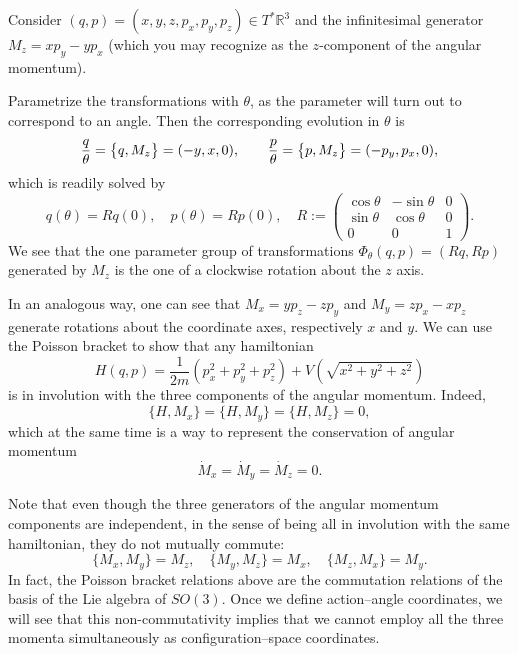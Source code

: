 \documentclass[english,fontsize=11pt,paper=a5,oneside]{scrbook}
\newcommand{\R}{\mathbb{R}}
\let\d\relax
\newcommand{\d}{\mathrm{d}}
\theoremstyle{definition}
\newenvironment{example}
  {\pushQED{\qed}\renewcommand{\qedsymbol}{$\lozenge$}\examplex}
  {\popQED\endexamplex}
\begin{document}
\begin{example}
  Consider $(q,p) = (x,y,z,p_x,p_y,p_z)\in T^* \R^3$ and the infinitesimal generator $M_z = x p_y - y p_x$ (which you may recognize as the $z$-component of the angular momentum).

  Parametrize the transformations with $\theta$, as the parameter will turn out to correspond to an angle. Then the corresponding evolution in $\theta$ is
  \begin{equation}
    \frac{\d q}{\d\theta} = \big\{q, M_z\big\} = (-y, x, 0),\qquad
    \frac{\d p}{\d\theta} = \big\{p, M_z\big\} = (-p_y, p_x, 0),
  \end{equation}
  which is readily solved by
  \begin{equation}
    q(\theta)= R q(0), \quad p(\theta) = R p(0), \quad
    R := \begin{pmatrix}
      \cos\theta & -\sin\theta & 0 \\
      \sin\theta & \cos\theta  & 0 \\
      0          & 0           & 1
    \end{pmatrix}.
  \end{equation}
  We see that the one parameter group of transformations $\Phi_\theta(q,p) = (Rq, Rp)$ generated by $M_z$ is the one of a clockwise rotation about the $z$ axis.

  In an analogous way, one can see that $M_x = yp_z-zp_y$ and $M_y = zp_x - xp_z$ generate rotations about the coordinate axes, respectively $x$ and $y$.
  We can use the Poisson bracket to show that any hamiltonian
  \begin{equation}
    H(q,p) = \frac1{2m}\left(p_x^2 + p_y^2 + p_z^2\right) + V\left(\sqrt{x^2 + y^2 + z^2}\right)
  \end{equation}
  is in involution with the three components of the angular momentum. Indeed,
  \begin{equation}
    \big\{H,M_x\big\} = \big\{H,M_y\big\} = \big\{H,M_z\big\} = 0,
  \end{equation}
  which at the same time is a way to represent the conservation of angular momentum
  \begin{equation}
    \dot M_x = \dot M_y = \dot M_z = 0.
  \end{equation}

  Note that even though the three generators of the angular momentum components are independent, in the sense of being all in involution with the same hamiltonian, they do not mutually commute:
  \begin{equation}\label{eq:commM}
    \big\{M_x, M_y\big\} = M_z, \quad
    \big\{M_y, M_z\big\} = M_x, \quad
    \big\{M_z, M_x\big\} = M_y.
  \end{equation}
  In fact, the Poisson bracket relations above are the commutation relations of the basis of the Lie algebra of $SO(3)$. %
  Once we define action--angle coordinates, we will see that this non-commutativity implies that we cannot employ all the three momenta simultaneously as configuration--space coordinates.


\end{example}
\end{document}
